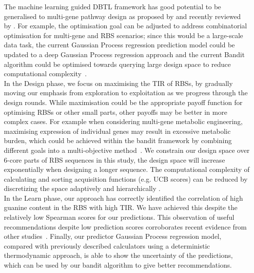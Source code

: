 \documentclass{article}
\begin{document}
The machine learning guided DBTL framework has good potential to be generalised to multi-gene pathway
design as proposed by \textcite{hamedirad2019towards} and recently reviewed by \textcite{LAWSON2021}.
For example, the optimisation goal can be adjusted to address combinatorial optimisation for multi-gene and RBS scenarios; since this would be a large-scale data task, the current Gaussian Process regression prediction model could be updated to a deep Gaussian Process regression approach and the current Bandit algorithm could be optimised towards querying large design space to reduce computational complexity~\cite{Shahriari2016}.\\

In the Design phase, we focus on maximising the TIR of RBSs, by gradually moving our emphasis from exploration to exploitation as we progress through the design rounds.
While maximisation could be the appropriate payoff function for optimising RBSs
or other small parts, other payoffs may be better in more complex cases.
For example when considering multi-gene metabolic engineering, maximising expression of individual genes may result in excessive metabolic burden, 
which could be achieved within the bandit framework by 
combining different goals into a multi-objective method~\cite{shu2020new}.
We constrain our design space over 6-core parts of RBS sequences in this study, the design space will increase exponentially when designing a longer sequence. 
The computational complexity of calculating and sorting acquisition functions (e.g. UCB scores) can be reduced by discretizing the space adaptively and hierarchically \cite{shekhar2018GPBanditDiscre, zhang2021GPOO}.\\


In the Learn phase, our approach has correctly identified the correlation of high guanine content in the RBS with high TIR.
We have achieved this despite the relatively low Spearman scores for our predictions. This observation of useful recommendations despite low prediction scores corroborates recent evidence from other studies~\cite{Radivojevic2020, Opgenorth2019}.
Finally, our predictor Gaussian Process regression model, compared with previously described calculators using a deterministic thermodynamic approach, is able to show the uncertainty of the predictions, which can be used by our bandit algorithm to give better recommendations.\\
\end{document}

